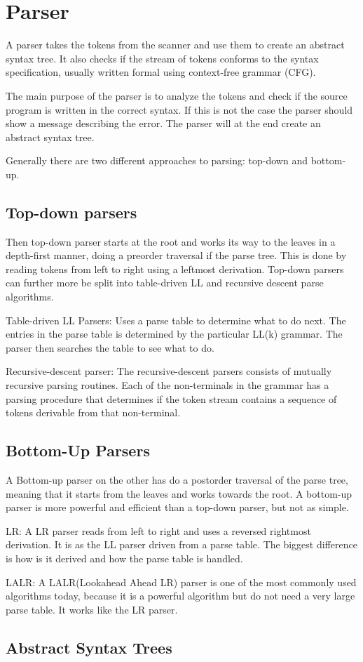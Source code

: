 \section{Parser}
A parser takes the tokens from the scanner and use them to create an abstract syntax tree. It also checks if the stream of tokens conforms to the syntax specification, usually written formal using context-free grammar (CFG).

The main purpose of the parser is to analyze the tokens and check if the source program is written in the correct syntax. If this is not the case the parser should show a message describing the error. The parser will at the end create an abstract syntax tree. 

Generally there are two different approaches to parsing: top-down and bottom-up.

\subsection*{Top-down parsers}
Then top-down parser starts at the root and works its way to the leaves in a depth-first manner, doing a preorder traversal if the parse tree.  This is done by reading tokens from left to right using a leftmost derivation. Top-down parsers can further more be split into table-driven LL  and recursive descent parse algorithms.

Table-driven LL Parsers:
Uses a parse table to determine what to do next. The entries in the parse table is determined by the particular LL(k) grammar. The parser then searches the table to see what to do.

Recursive-descent parser:
The recursive-descent parsers consists of mutually recursive parsing routines. Each of the non-terminals in the grammar has a parsing procedure that determines if the token stream contains a sequence of tokens derivable from that non-terminal.

\subsection*{Bottom-Up Parsers}

A Bottom-up parser on the other has do a postorder traversal of the parse tree, meaning that it starts from the leaves and works towards the root.
A bottom-up parser is more powerful and efficient than a top-down parser, but not as simple.

LR:
A LR parser reads from left to right and uses a reversed rightmost derivation. It is as the LL parser driven from a parse table. The biggest difference is how is it derived and how the parse table is handled.  

LALR:
A LALR(Lookahead Ahead LR) parser is one of the most commonly used algorithms today, because it is a powerful algorithm but do not need a very large parse table. It works like the LR parser.

\subsection*{Abstract Syntax Trees}



